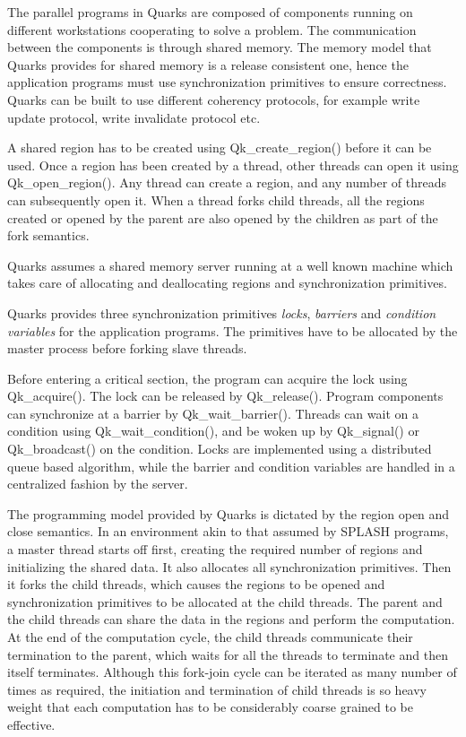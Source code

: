 The parallel programs in Quarks are composed of components running on
different workstations cooperating to solve a problem. The
communication between the components is through shared memory.
The memory model that Quarks provides for shared memory is a
release consistent one, hence the application programs must use
synchronization primitives to ensure correctness. Quarks can be built
to use different coherency protocols, for example write update
protocol, write invalidate protocol etc. 

A shared region has to be created using Qk\_create\_region() before it
can be used. Once a region has been created by a thread, other threads
can open it using Qk\_open\_region(). Any thread can create a region,
and any number of threads can subsequently open it. When a thread
forks child threads, all the regions created or opened by the parent
are also opened by the children as part of the fork semantics.

Quarks assumes a shared memory server running at a well known machine
which takes care of allocating and deallocating regions and 
synchronization primitives.


Quarks provides three synchronization primitives {\em locks}, {\em
barriers} and {\em condition variables} for the application programs.
The primitives have to be allocated by the master process before
forking slave threads. 

Before entering a critical section, the program can acquire the lock
using Qk\_acquire(). The lock can be released by Qk\_release(). 
Program components can synchronize at a barrier by
Qk\_wait\_barrier().
Threads can wait on a condition using Qk\_wait\_condition(),
and be woken up by
Qk\_signal() or Qk\_broadcast() on the condition. Locks are implemented using
a distributed queue based algorithm, while the barrier and condition
variables are handled in a centralized fashion by the server. 


The programming model provided by Quarks is dictated by the region
open and close semantics. In an environment akin to that assumed by
SPLASH\cite{splash} programs, a master thread starts off first,
creating the required number of regions and initializing the shared
data. It also allocates all synchronization primitives. Then it forks
the child threads, which causes the regions to be opened and
synchronization primitives to be allocated at the child threads.
The parent and the child threads can share the data in the regions
and perform the computation. At the end of the computation cycle, the
child threads communicate their termination to the parent, which waits
for all the threads to terminate and then itself terminates. Although 
this fork-join cycle can be iterated as many number of times as
required, the initiation and termination of child threads is so heavy
weight that each computation has to be considerably coarse grained to
be effective. 

